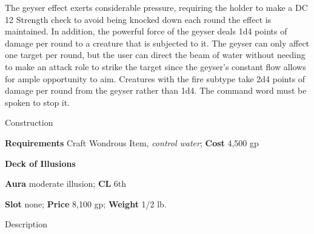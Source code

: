 The geyser effect exerts considerable pressure, requiring the holder to make a DC 12 Strength check to avoid being knocked down each round the effect is maintained. In addition, the powerful force of the geyser deals 1d4 points of damage per round to a creature that is subjected to it. The geyser can only affect one target per round, but the user can direct the beam of water without needing to make an attack role to strike the target since the geyser's constant flow allows for ample opportunity to aim. Creatures with the fire subtype take 2d4 points of damage per round from the geyser rather than 1d4. The command word must be spoken to stop it. 
				
Construction
				
\textbf{Requirements} Craft Wondrous Item, \textit{control water};\textbf{ Cost }4,500 gp
				
\textbf{Deck of Illusions}
				
\textbf{Aura} moderate illusion;\textbf{ CL }6th
				
\textbf{Slot} none; \textbf{Price} 8,100 gp; \textbf{Weight} 1/2 lb.
				
Description
				
